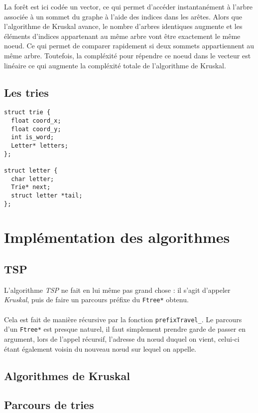 \documentclass[a4paper]{article}
\begin{document}
La forêt est ici codée un vector, ce qui permet d'accéder instantanément à l'arbre associée à un sommet du graphe à l'aide des indices dans les arêtes. Alors que l'algorithme de Kruskal avance, le nombre d'arbres identiques augmente et les éléments d'indices appartenant au même arbre vont être exactement le même noeud. Ce qui permet de comparer rapidement si deux sommets appartiennent au même arbre. Toutefois, la compléxité pour répendre ce noeud dans le vecteur est linéaire ce qui augmente la compléxité totale de l'algorithme de Kruskal.

\subsection{Les tries}

\begin{verbatim}
struct trie {
  float coord_x;
  float coord_y;
  int is_word;
  Letter* letters;
};

struct letter {
  char letter;
  Trie* next;
  struct letter *tail;
};
\end{verbatim}

\section{Implémentation des algorithmes}

\subsection{TSP}
L'algorithme \emph{TSP} ne fait en lui même pas grand chose : il s'agit d'appeler \emph{Kruskal}, puis de faire un parcours préfixe du \texttt{Ftree*} obtenu.

\paragraph*{}
Cela est fait de manière récursive par la fonction \texttt{prefixTravel\_}. Le parcours d'un \texttt{Ftree*} est presque naturel, il faut simplement prendre garde de passer en argument, lors de l'appel récursif, l'adresse du nœud duquel on vient, celui-ci étant également voisin du nouveau nœud sur lequel on appelle.
\subsection{Algorithmes de Kruskal}

\subsection{Parcours de tries}
\end{document}
